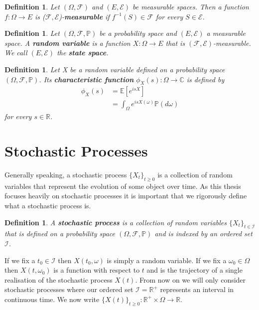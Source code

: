 \documentclass[honours,12pt]{unswthesis}
\newcommand{\R}{\mathbb{R}}
\newcommand{\C}{\mathbb{C}}
\newcommand{\PP}{\mathbb{P}}
\newcommand{\E}{\mathbb{E}}
\newcommand{\Rp}{\mathbb R^+}
\newcommand{\1}{\mathbf 1}
\newcommand{\FF}{\mathcal{F}}
\newtheorem{definition}[equation]{Definition}
\numberwithin{equation}{section}
\theoremstyle{definition}
\theoremstyle{remark}
\begin{document}
\begin{definition}
Let $(\Omega,\FF)$ and $(E,\mathcal{E})$ be measurable spaces. Then a function $f: \Omega \rightarrow E$ is ($\FF,\mathcal{E}$)-\textbf{measurable} if $f^{-1}(S)\in \FF$ for every $S\in \mathcal{E}$.\\
\end{definition}

\begin{definition}
Let $(\Omega,\FF,\PP)$ be a probability space and $(E,\mathcal{E})$ a measurable space. A \textbf{random variable} is a function $X:\Omega \rightarrow E$ that is $(\FF,\mathcal{E})$-measurable. We call $(E,\mathcal{E})$ the \textbf{state space}. \\
\end{definition}

\begin{definition}
	Let X be a random variable defined on a probability space $(\Omega,\FF,\PP)$. Its \textbf{characteristic function} $\phi_X(s):\Omega\to\C$ is defined by 
	\begin{align*}
		\phi_X(s)&=\E[e^{isX}]\\
		&=\int_\Omega e^{isX(\omega)} \PP(d\omega)
	\end{align*}
	for every $s \in \R$.
\end{definition}

\section{Stochastic Processes}
Generally speaking, a stochastic process $\{X_t\}_{t\geq 0}$ is a collection of random variables that represent the evolution of some object over time. As this thesis focuses heavily on stochastic processes it is important that we rigorously define what a stochastic process is.\\

\begin{definition}
A \textbf{stochastic process} is a collection of random variables $\{X_t\}_{t\in \mathcal{I}}$ that is defined on a probability space $(\Omega, \FF,\PP)$ and is indexed by an ordered set $\mathcal{I}$. \\
\end{definition}

\noindent If we fix a $t_0\in \mathcal{I}$ then $X(t_0,\omega)$ is simply a random variable. If we fix a $\omega_0\in \Omega$ then $X(t,\omega_0)$ is a function with respect to $t$ and is the trajectory of a single realisation of the stochastic process $X(t)$. From now on we will only consider stochastic processes where our ordered set $\mathcal{I}=\Rp$ represents an interval in continuous time. We now write $\{X(t)\}_{t\geq 0}:\Rp\times\Omega\to\R$.\\ 
\end{document}
